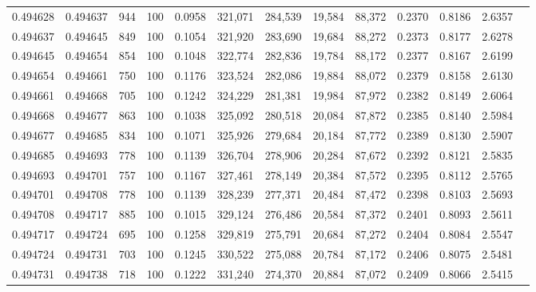 \begin{tabular}{rrrrrrrrrrrrr}
0.494628 & 0.494637 &   944 & 100 &                                     0.0958 & 321,071 & 284,539 &  19,584 &  88,372 & 0.2370 & 0.8186 & 2.6357 \\
0.494637 & 0.494645 &   849 & 100 &                                     0.1054 & 321,920 & 283,690 &  19,684 &  88,272 & 0.2373 & 0.8177 & 2.6278 \\
0.494645 & 0.494654 &   854 & 100 &                                     0.1048 & 322,774 & 282,836 &  19,784 &  88,172 & 0.2377 & 0.8167 & 2.6199 \\
0.494654 & 0.494661 &   750 & 100 &                                     0.1176 & 323,524 & 282,086 &  19,884 &  88,072 & 0.2379 & 0.8158 & 2.6130 \\
0.494661 & 0.494668 &   705 & 100 &                                     0.1242 & 324,229 & 281,381 &  19,984 &  87,972 & 0.2382 & 0.8149 & 2.6064 \\
0.494668 & 0.494677 &   863 & 100 &                                     0.1038 & 325,092 & 280,518 &  20,084 &  87,872 & 0.2385 & 0.8140 & 2.5984 \\
0.494677 & 0.494685 &   834 & 100 &                                     0.1071 & 325,926 & 279,684 &  20,184 &  87,772 & 0.2389 & 0.8130 & 2.5907 \\
0.494685 & 0.494693 &   778 & 100 &                                     0.1139 & 326,704 & 278,906 &  20,284 &  87,672 & 0.2392 & 0.8121 & 2.5835 \\
0.494693 & 0.494701 &   757 & 100 &                                     0.1167 & 327,461 & 278,149 &  20,384 &  87,572 & 0.2395 & 0.8112 & 2.5765 \\
0.494701 & 0.494708 &   778 & 100 &                                     0.1139 & 328,239 & 277,371 &  20,484 &  87,472 & 0.2398 & 0.8103 & 2.5693 \\
0.494708 & 0.494717 &   885 & 100 &                                     0.1015 & 329,124 & 276,486 &  20,584 &  87,372 & 0.2401 & 0.8093 & 2.5611 \\
0.494717 & 0.494724 &   695 & 100 &                                     0.1258 & 329,819 & 275,791 &  20,684 &  87,272 & 0.2404 & 0.8084 & 2.5547 \\
0.494724 & 0.494731 &   703 & 100 &                                     0.1245 & 330,522 & 275,088 &  20,784 &  87,172 & 0.2406 & 0.8075 & 2.5481 \\
0.494731 & 0.494738 &   718 & 100 &                                     0.1222 & 331,240 & 274,370 &  20,884 &  87,072 & 0.2409 & 0.8066 & 2.5415 \\

\end{tabular}
